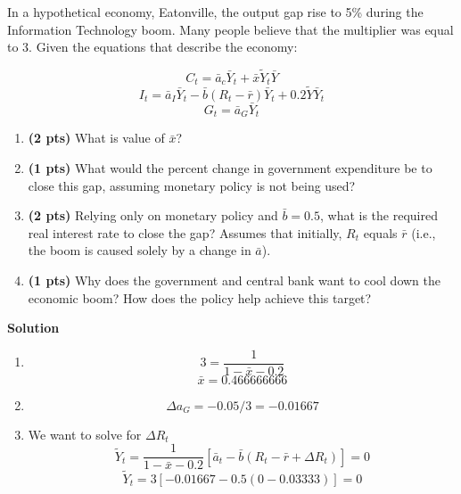 \documentclass[addpoints,12pt,answers]{exam}
\begin{document}
\begin{questions}
		
		\clearpage
		\question  In a hypothetical economy, Eatonville, the output gap rise to 5\% during the Information Technology boom. Many people believe that the multiplier was equal to 3. Given the equations that describe the economy:
		
		\[C_t = \bar{a}_c \bar{Y}_t + \bar{x} \widetilde{Y}_t \bar{Y}\]
		\[I_t = \bar{a}_I \bar{Y}_t - \bar{b} \left(R_t - \bar{r}\right)\bar{Y}_t + 0.2\widetilde{Y} \bar{Y}_t\]
		\[G_t = \bar{a}_G \bar{Y}_t\]
		
		
		\begin{enumerate}[label=(\alph*)]
			\item \textbf{(2  pts)} What is value of $\bar{x}$? 
			
			\item \textbf{(1  pts)} What would the percent change in government expenditure be to close this gap, assuming monetary policy is not being used?
			
			\item \textbf{(2  pts)} Relying only on monetary policy and $\bar{b}=0.5$, what is the required real interest rate to close the gap? Assumes that initially, $R_t$ equals $\bar{r}$ (i.e., the boom is caused solely by a change in $\bar{a}$).
			
			\item \textbf{(1  pts)} Why does the government and central bank want to cool down the economic boom? How does the policy help achieve this target?
			
		\end{enumerate}
		
		\clearpage
		\textbf{Solution}
		\begin{enumerate}[label=(\alph*)]
			\item  \[3 = \frac{1}{1-\bar{x} - 0.2}\]
			\[\bar{x} = 0.466666666\]
			\vspace{1cm}
			\item  \[ \Delta a_G = -0.05/3 = -0.01667\]
			\item  We want to solve for $\Delta R_t$
			\[\widetilde{Y}_t = \frac{1}{1-\bar{x} - 0.2} \left[\bar{a}_t - \bar{b} \left(R_t-\bar{r}+\Delta R_t\right) \right] = 0\]
			\[\widetilde{Y}_t = 3 \left[-0.01667 - 0.5 \left(0-0.03333\right) \right] = 0\]
			

\end{enumerate}
\end{questions}
\end{document}
